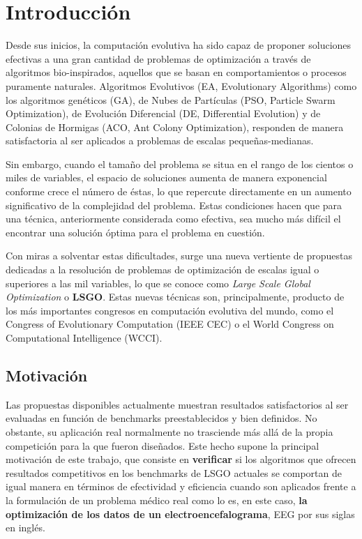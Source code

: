 \chapter{Introducción}

Desde sus inicios, la computación evolutiva ha sido capaz de proponer soluciones efectivas a una gran cantidad de problemas de optimización a través de algoritmos bio-inspirados, aquellos que se basan en comportamientos o procesos puramente naturales. Algoritmos Evolutivos (EA, Evolutionary Algorithms) como los algoritmos genéticos (GA)\cite{GA-RPO}, de Nubes de Partículas (PSO, Particle Swarm Optimization)\cite{PSO}, de Evolución Diferencial (DE, Differential Evolution)\cite{DE} y de Colonias de Hormigas (ACO, Ant Colony Optimization)\cite{ACO}, responden de manera satisfactoria al ser aplicados a problemas de escalas pequeñas-medianas.

Sin embargo, cuando el tamaño del problema se situa en el rango de los cientos o miles de variables, el espacio de soluciones aumenta de manera exponencial conforme crece el número de éstas, lo que repercute directamente en un aumento significativo de la complejidad del problema. Estas condiciones hacen que para una técnica, anteriormente considerada como efectiva, sea mucho más difícil el encontrar una solución óptima para el problema en cuestión.

Con miras a solventar estas dificultades, surge una nueva vertiente de propuestas dedicadas a la resolución de problemas de optimización de escalas igual o superiores a las mil variables, lo que se conoce como \textit{Large Scale Global Optimization} o \textbf{LSGO}\cite{ELSGOI}. Estas nuevas técnicas son, principalmente, producto de los más importantes congresos en computación evolutiva del mundo, como el Congress of Evolutionary Computation (IEEE CEC) o el World Congress on Computational Intelligence (WCCI).

\section{Motivación}

Las propuestas disponibles actualmente muestran resultados satisfactorios al ser evaluadas en función de benchmarks preestablecidos y bien definidos. No obstante, su aplicación real normalmente no trasciende más allá de la propia competición para la que fueron diseñados. Este hecho supone la principal motivación de este trabajo, que consiste en \textbf{verificar} si los algoritmos que ofrecen resultados competitivos en los benchmarks de LSGO actuales se comportan de igual manera en términos de efectividad y eficiencia cuando son aplicados frente a la formulación de un problema médico real como lo es, en este caso, \textbf{la optimización de los datos de un electroencefalograma}, EEG por sus siglas en inglés.

